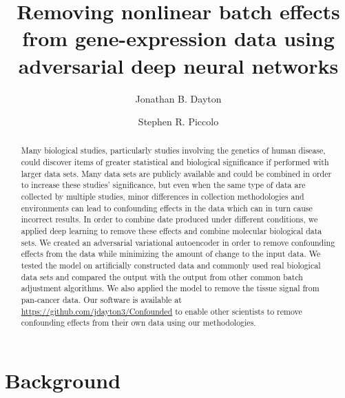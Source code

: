 \documentclass[notitlepage]{article}
\begin{document}
\title{Removing nonlinear batch effects from gene-expression data using adversarial deep neural networks}
\author[1]{Jonathan B. Dayton}
\author[1]{Stephen R. Piccolo}
\date{}

\maketitle

\begin{abstract}
	Many biological studies, particularly studies involving the genetics of human disease, could discover items of greater statistical and biological significance if performed with larger data sets.
	Many data sets are publicly available and could be combined in order to increase these studies' significance, but even when the same type of data are collected by multiple studies, minor differences in collection methodologies and environments can lead to confounding effects in the data which can in turn cause incorrect results.
	In order to combine date produced under different conditions, we applied deep learning to remove these effects and combine molecular biological data sets.
	We created an adversarial variational autoencoder in order to remove confounding effects from the data while minimizing the amount of change to the input data.
	We tested the model on artificially constructed data and commonly used real biological data sets and compared the output with the output from other common batch adjustment algorithms.
	We also applied the model to remove the tissue signal from pan-cancer data.
	Our software is available at \href{https://github.com/jdayton3/Confounded}{https://github.com/jdayton3/Confounded} to enable other scientists to remove confounding effects from their own data using our methodologies.
\end{abstract}

\section{Background} \label{sec:background}
\end{document}
